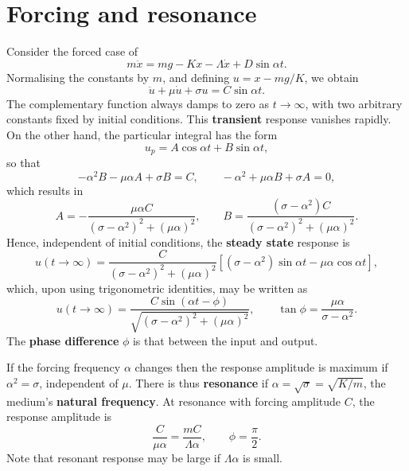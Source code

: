 \documentclass[letter-paper]{tufte-book}
\newcommand\Def[1]{\textbf{#1}}
\begin{document}

\section{Forcing and resonance}

Consider the forced case of
\begin{equation*}
  m\ddot{x} = mg - Kx - \Lambda \dot{x} + D\sin\alpha t.
\end{equation*}
Normalising the constants by $m$, and defining $u = x - mg/K$, we obtain
\begin{equation*}
  \ddot{u} + \mu \dot{u} + \sigma u = C\sin\alpha t.
\end{equation*}
The complementary function always damps to zero as $t\to\infty$, with two
arbitrary constants fixed by initial conditions. This \Def{transient}
response vanishes rapidly. On the other hand, the particular integral has the
form
\begin{equation*}
  u_p = A\cos\alpha t + B\sin\alpha t,
\end{equation*}
so that
\begin{equation*}
  -\alpha^2 B - \mu\alpha A + \sigma B = C, \qquad
  -\alpha^2 + \mu\alpha B + \sigma A = 0,
\end{equation*}
which results in
\begin{equation*}
  A = -\frac{\mu\alpha C}{(\sigma - \alpha^2)^2 + (\mu\alpha)^2}, \qquad
  B = \frac{(\sigma - \alpha^2)C}{(\sigma - \alpha^2)^2 + (\mu\alpha)^2}.
\end{equation*}
Hence, independent of initial conditions, the \Def{steady state} response
is
\begin{equation*}
  u(t\to\infty) = \frac{C}{(\sigma - \alpha^2)^2 + (\mu\alpha)^2} \left[
  (\sigma - \alpha^2)\sin\alpha t - \mu\alpha\cos\alpha t\right],
\end{equation*}
which, upon using trigonometric identities, may be written as
\begin{equation*}
  u(t\to\infty) = \frac{C \sin(\alpha t - \phi)}{\sqrt{(\sigma - \alpha^2)^2 +
  (\mu\alpha)^2}}, \qquad \tan\phi = \frac{\mu\alpha}{\sigma - \alpha^2}.
\end{equation*}
The \Def{phase difference} $\phi$ is that between the input and output.

If the forcing frequency $\alpha$ changes then the response amplitude is maximum
if $\alpha^2 = \sigma$, independent of $\mu$. There is thus
\Def{resonance} if $\alpha = \sqrt{\sigma} = \sqrt{K/m}$, the medium's
\Def{natural frequency}. At resonance with forcing amplitude $C$, the
response amplitude is
\begin{equation*}
  \frac{C}{\mu\alpha} = \frac{mC}{\Lambda \alpha}, \qquad \phi = \frac{\pi}{2}.
\end{equation*}
Note that resonant response may be large if $\Lambda \alpha$ is small.
\end{document}
